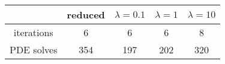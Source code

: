 \begin{tabular}{ccccc}
& reduced & $\lambda = 0.1$ & $\lambda = 1$ & $\lambda = 10$ \\
\hline
iterations & 6 & 6 & 6 & 8 \\
PDE solves & 354 & 197 & 202 & 320 \\
\hline
\end{tabular}

